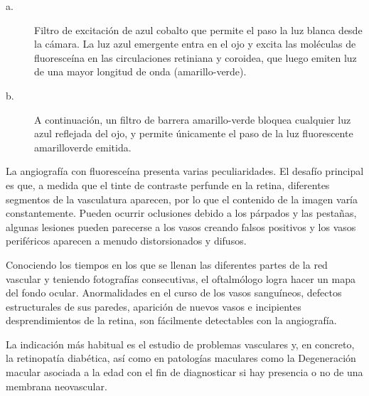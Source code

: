 \begin{description}
  \item[a.] 
 Filtro de excitación de azul cobalto que permite el paso la luz blanca desde la cámara. La luz azul emergente
entra en el ojo y excita las moléculas de fluoresceína en las circulaciones retiniana y coroidea, que luego emiten
luz de una mayor longitud de onda (amarillo-verde).
\item[b.] A continuación, un filtro de barrera amarillo-verde bloquea cualquier luz azul reflejada del ojo, y permite
únicamente el paso de la luz fluorescente amarilloverde emitida.\cite{kanski2012oftalmologia}
\end{description}





La angiografía con fluoresceína presenta varias peculiaridades. El desafío principal es que, a medida que el tinte de contraste  perfunde en la retina, diferentes segmentos de la vasculatura aparecen, por lo que el contenido de la imagen varía constantemente.
Pueden ocurrir oclusiones debido a los párpados y las pestañas, algunas lesiones pueden parecerse a los vasos creando falsos positivos y los vasos periféricos aparecen a menudo distorsionados y difusos. \cite{perez2011improving}

Conociendo los tiempos en los que se llenan las diferentes partes de la red vascular y teniendo fotografías consecutivas, el oftalmólogo logra hacer un mapa del fondo ocular. Anormalidades en el curso de los vasos sanguíneos, defectos estructurales de sus paredes, aparición de nuevos vasos e incipientes desprendimientos de la retina, son fácilmente detectables con la angiografía. 

La indicación más habitual es el estudio de problemas vasculares y, en concreto, la retinopatía diabética, así como en patologías maculares como la Degeneración macular asociada a la edad con el fin de diagnosticar si hay presencia o no de una membrana neovascular.
\\

